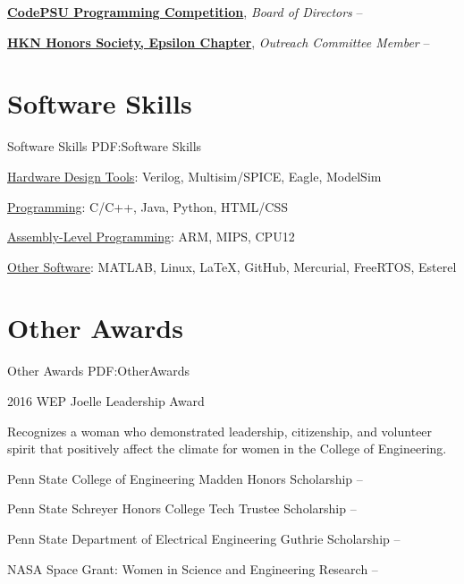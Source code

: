 \documentclass[letterpaper,10pt,oneside]{article}
\newcommand{\CVNote}{resume compiled on {\today}}
\begin{document}
\begin{body}
\GapNoBreak
\href{http://www.codepsu.com}
{\textbf{CodePSU Programming Competition}},
\textit{Board of Directors}
\hfill
{} --

\GapNoBreak
\href{http://www.ee.psu.edu/hkn/}
{\textbf{HKN Honors Society, Epsilon Chapter}},
\textit{Outreach Committee Member}
\hfill
{} --


\section
{Software Skills}
{Software Skills}
{PDF:Software Skills}

\underline{Hardware Design Tools}: 
Verilog, Multisim/SPICE, Eagle, ModelSim
\GapNoBreak

\underline{Programming}: 
C/C++, Java, Python, HTML/CSS
\GapNoBreak

\underline{Assembly-Level Programming}: 
ARM, MIPS, CPU12
\GapNoBreak

\underline{Other Software}: 
MATLAB, Linux, \LaTeX, GitHub, Mercurial, FreeRTOS, Esterel
\GapNoBreak


\section
{Other Awards}
{Other Awards}
{PDF:OtherAwards}

2016 WEP Joelle Leadership Award
\hfill
{}
\begin{detail}
\SubItem
Recognizes a woman who demonstrated leadership, citizenship, and volunteer spirit \newline
that positively affect the climate for women in the College of Engineering.
\end{detail}

\GapNoBreak
Penn State College of Engineering Madden Honors Scholarship
\hfill
{}--

\GapNoBreak
Penn State Schreyer Honors College Tech Trustee Scholarship
\hfill
{}--

\GapNoBreak
Penn State Department of Electrical Engineering Guthrie Scholarship
\hfill
{}--

\GapNoBreak
NASA Space Grant: Women in Science and Engineering Research
\hfill
{}--

\Gap
\end{body}

\begin{flushright}
\UseNoteFont%
[\textit{\CVNote}]%
\hspace{2.0mm}\null
\end{flushright}
\end{document}
